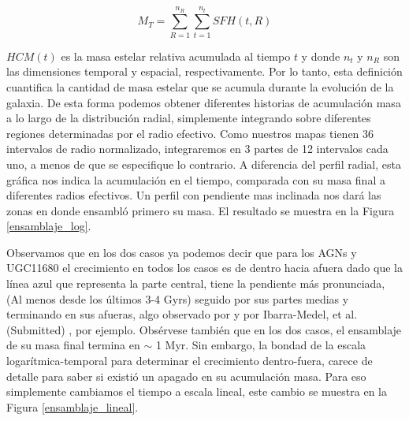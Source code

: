 \begin{equation}
M_{T}= \sum_{R=1}^{n_R} \sum_{t=1}^{n_t} SFH(t,R)
\end{equation}

\bigskip

\noindent  $HCM(t)$  es la masa estelar relativa acumulada al tiempo $t$ y donde $n_t$ y $n_R$ son las dimensiones temporal y espacial, respectivamente. Por lo tanto, esta definición cuantifica la cantidad de masa estelar que se acumula durante la evolución de la galaxia. De esta forma podemos obtener diferentes historias de acumulación masa a lo largo de la distribución radial, simplemente integrando sobre diferentes regiones determinadas por el radio efectivo. Como nuestros mapas tienen 36 intervalos de radio normalizado, integraremos en 3 partes de 12 intervalos cada uno, a menos de que se especifique lo contrario. A diferencia del perfil radial, esta gráfica nos indica la acumulación en el tiempo, comparada con su masa final a diferentes radios efectivos. Un perfil con pendiente mas inclinada nos dará las zonas en donde ensambló primero su masa. El resultado se muestra en la Figura \ref{ensamblaje_log}.

\bigskip

\noindent Observamos que en los dos casos ya podemos decir que para los AGNs y UGC11680 el crecimiento en todos los casos es de dentro hacia afuera dado que la línea azul que representa la parte central, tiene la pendiente más pronunciada, (Al menos desde los últimos 3-4 Gyrs) seguido por sus partes medias y terminando en sus afueras, algo observado por \citet{perez2013} y por {\color{red} Ibarra-Medel, et al. (Submitted) }, por ejemplo. Obsérvese también que en los dos casos, el ensamblaje de su masa final termina en $\sim$ 1 Myr. Sin embargo, la bondad de la escala logarítmica-temporal para determinar el crecimiento dentro-fuera, carece de detalle para saber si existió un apagado en su acumulación masa. Para eso simplemente cambiamos el tiempo a escala lineal, este cambio se muestra en la Figura \ref{ensamblaje_lineal}.


